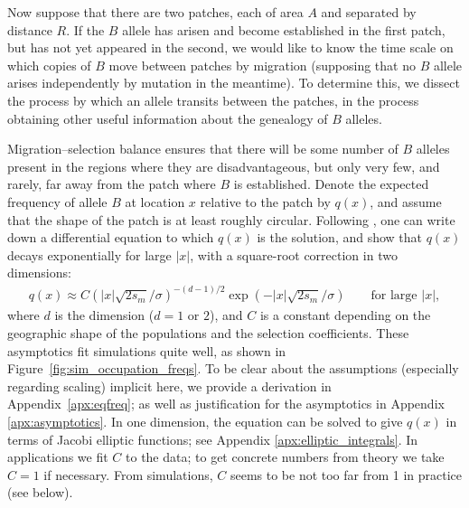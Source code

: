 \documentclass{article}
\begin{document}
Now suppose that there are two patches, each of area $A$ and separated by distance $R$. 
If the $B$ allele has arisen and become established in the first patch, but has not yet appeared in the second,
we would like to know the time scale on which copies of $B$ move between patches by migration
(supposing that no $B$ allele arises independently by mutation in the meantime).
To determine this, we dissect the process by which an allele transits between the patches,
in the process obtaining other useful information about the genealogy of $B$ alleles.

Migration--selection balance ensures that 
there will be some number of $B$ alleles present in the regions where they are disadvantageous,
but only very few, and rarely, far away from the patch where $B$ is established.
Denote the expected frequency of allele $B$ at location $x$ relative to the patch by $q(x)$,
and assume that the shape of the patch is at least roughly circular.
Following \citet{slatkin1973geneflow}, one can write down a differential equation to which $q(x)$ is the solution,
and show that $q(x)$ decays exponentially for large $|x|$,
with a square-root correction in two dimensions:
\begin{align} \label{eqn:eqfreq}
  q(x) \approx C \left( |x| \sqrt{2 s_m}/\sigma \right)^{-(d-1)/2} \exp( - |x| \sqrt{2 s_m} / \sigma) \qquad \text{for large $|x|$},
\end{align}
where $d$ is the dimension ($d=1$ or $2$), 
and $C$ is a constant depending on the geographic shape of the populations and the selection coefficients.
These asymptotics fit simulations quite well, as shown in Figure~\ref{fig:sim_occupation_freqs}.
To be clear about the assumptions (especially regarding scaling) implicit here,
we provide a derivation in Appendix~\ref{apx:eqfreq}; 
as well as justification for the asymptotics in Appendix \ref{apx:asymptotics}.
In one dimension, the equation can be solved to give $q(x)$ 
in terms of Jacobi elliptic functions; see Appendix \ref{apx:elliptic_integrals}.
In applications we fit $C$ to the data;
to get concrete numbers from theory we take $C=1$ if necessary.
From simulations, $C$ seems to be not too far from 1 in practice (see below).
\end{document}
